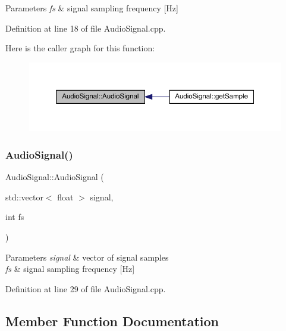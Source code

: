 \begin{DoxyParams}{Parameters}
{\em fs} & signal sampling frequency \mbox{[}Hz\mbox{]} \\
\hline
\end{DoxyParams}


Definition at line 18 of file Audio\+Signal.\+cpp.

Here is the caller graph for this function\+:
\nopagebreak
\begin{figure}[H]
\begin{center}
\leavevmode
\includegraphics[width=350pt]{class_audio_signal_a72df7e0c092777d7b829ee7229d5d6f8_icgraph}
\end{center}
\end{figure}
\mbox{\label{class_audio_signal_a755ad45352e2b260a2ee7fde2440a486}} 
\subsubsection{\texorpdfstring{Audio\+Signal()}{AudioSignal()}\hspace{0.1cm}{\footnotesize\ttfamily [2/2]}}
{\footnotesize\ttfamily Audio\+Signal\+::\+Audio\+Signal (\begin{DoxyParamCaption}\item[{std\+::vector$<$ float $>$}]{signal,  }\item[{int}]{fs }\end{DoxyParamCaption})}


\begin{DoxyParams}{Parameters}
{\em signal} & vector of signal samples \\
\hline
{\em fs} & signal sampling frequency \mbox{[}Hz\mbox{]} \\
\hline
\end{DoxyParams}


Definition at line 29 of file Audio\+Signal.\+cpp.



\subsection{Member Function Documentation}
\mbox{\label{class_audio_signal_a94c974f752e3045190944860bd8b0ad8}} 
